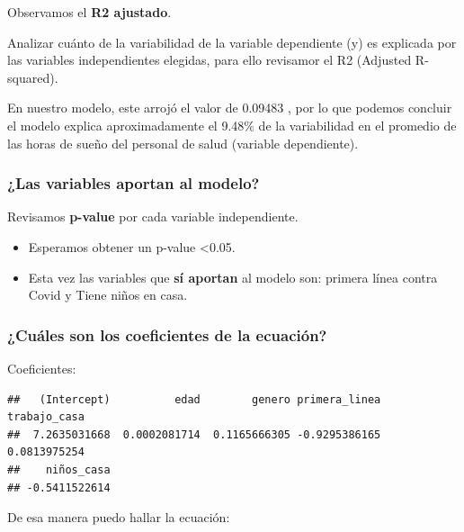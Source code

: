 \documentclass[
]{article}
\newenvironment{Shaded}{\begin{snugshade}}{\end{snugshade}}
\newcommand{\NormalTok}[1]{#1}
\newcommand{\SpecialCharTok}[1]{\textcolor[rgb]{0.81,0.36,0.00}{\textbf{#1}}}
\providecommand{\tightlist}{%
  \setlength{\itemsep}{0pt}\setlength{\parskip}{0pt}}
\begin{document}
Observamos el \textbf{R2 ajustado}.

Analizar cuánto de la variabilidad de la variable dependiente (y) es
explicada por las variables independientes elegidas, para ello revisamor
el R2 (Adjusted R-squared).

En nuestro modelo, este arrojó el valor de 0.09483 , por lo que podemos
concluir el modelo explica aproximadamente el 9.48\% de la variabilidad
en el promedio de las horas de sueño del personal de salud (variable
dependiente).

\subsubsection{\texorpdfstring{\textbf{¿Las variables aportan al
modelo?}}{¿Las variables aportan al modelo?}}\label{las-variables-aportan-al-modelo-2}

Revisamos \textbf{p-value} por cada variable independiente.

\begin{itemize}
\tightlist
\item
  Esperamos obtener un p-value \textless0.05.
\item
  Esta vez las variables que \textbf{sí aportan} al modelo son: primera
  línea contra Covid y Tiene niños en casa.
\end{itemize}

\subsubsection{\texorpdfstring{\textbf{¿Cuáles son los coeficientes de
la
ecuación?}}{¿Cuáles son los coeficientes de la ecuación?}}\label{cuuxe1les-son-los-coeficientes-de-la-ecuaciuxf3n-2}

Coeficientes:

\begin{Shaded}
\end{Shaded}

\begin{verbatim}
##   (Intercept)          edad        genero primera_linea  trabajo_casa 
##  7.2635031668  0.0002081714  0.1165666305 -0.9295386165  0.0813975254 
##    niños_casa 
## -0.5411522614
\end{verbatim}

De esa manera puedo hallar la ecuación:
\end{document}
